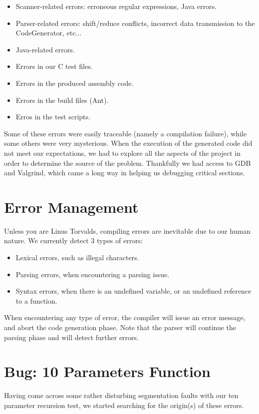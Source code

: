 \documentclass{scrartcl}
\begin{document}
\begin{itemize}
\item Scanner-related errors: erroneous regular expressions, Java errors.
\item Parser-related errors: shift/reduce conflicts, incorrect data transmission to the CodeGenerator, etc...
\item Java-related errors.
\item Errors in our C test files.
\item Errors in the produced assembly code.
\item Errors in the build files (Ant).
\item Erros in the test scripts.
\end{itemize}

Some of these errors were easily traceable (namely a compilation failure), while some others were very mysterious. When the execution of the generated code did not meet our expectations, we had to explore all the aspects of the project in order to determine the source of the problem. Thankfully we had access to GDB and Valgrind, which came a long way in helping us debugging critical sections.\\


\section{Error Management}
Unless you are Linus Torvalds, compiling errors are inevitable due to our human nature. We currently detect 3 types of errors:

\begin{itemize}
\item Lexical errors, such as illegal characters.
\item Parsing errors, when encountering a parsing issue.
\item Syntax errors, when there is an undefined variable, or an undefined reference to a function.
\end{itemize}

When encountering any type of error, the compiler will issue an error message, and abort the code generation phase. Note that the parser will continue the parsing phase and will detect further errors.

\section{Bug: 10 Parameters Function}
Having come across some rather disturbing segmentation faults with our ten parameter recursion test, we started searching for the origin(s) of these errors.\\
\end{document}
